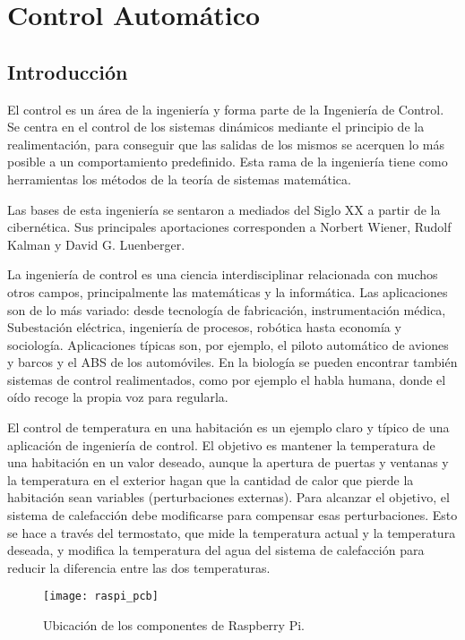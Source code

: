 \chapter{Control Automático}
\section{Introducción}

El control es un área de la ingeniería y forma parte de la Ingeniería de
Control. Se centra en el control de los sistemas dinámicos mediante el principio
de la realimentación, para conseguir que las salidas de los mismos se acerquen
lo más posible a un comportamiento predefinido. Esta rama de la ingeniería tiene
como herramientas los métodos de la teoría de sistemas matemática.

Las bases de esta ingeniería se sentaron a mediados del Siglo XX a partir de la
cibernética. Sus principales aportaciones corresponden a Norbert Wiener, Rudolf
Kalman y David G. Luenberger.

La ingeniería de control es una ciencia interdisciplinar relacionada con muchos
otros campos, principalmente las matemáticas y la informática. Las aplicaciones
son de lo más variado: desde tecnología de fabricación, instrumentación médica,
Subestación eléctrica, ingeniería de procesos, robótica hasta economía y
sociología. Aplicaciones típicas son, por ejemplo, el piloto automático de
aviones y barcos y el ABS de los automóviles. En la biología se pueden encontrar
también sistemas de control realimentados, como por ejemplo el habla humana,
donde el oído recoge la propia voz para regularla.

El control de temperatura en una habitación es un ejemplo claro y típico de una
aplicación de ingeniería de control. El objetivo es mantener la temperatura de
una habitación en un valor deseado, aunque la apertura de puertas y ventanas y
la temperatura en el exterior hagan que la cantidad de calor que pierde la
habitación sean variables (perturbaciones externas). Para alcanzar el objetivo,
el sistema de calefacción debe modificarse para compensar esas perturbaciones.
Esto se hace a través del termostato, que mide la temperatura actual y la
temperatura deseada, y modifica la temperatura del agua del sistema de
calefacción para reducir la diferencia entre las dos temperaturas.
\begin{figure}
  \centering
    \texttt{[image: raspi\_pcb]}
  \caption{Ubicación de los componentes de Raspberry Pi. \cite{raspberry_pi_wiki}}
  \label{fig:raspi_pcb}
\end{figure}

